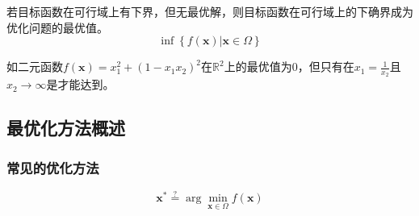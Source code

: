\begin{example}
    若目标函数在可行域上有下界，但无最优解，则目标函数在可行域上的下确界成为优化问题的最优值。
    \[
        \operatorname{inf}\left\{ f(\boldsymbol{x})| \boldsymbol{x}\in \Omega \right\}
    \]

    如二元函数$f(\boldsymbol{x}) = x_1^2+(1-x_1x_2)^2$在$\mathbb{R}^2$上的最优值为0，但只有在$x_1 = \frac{1}{x_2}$且$x_2\to \infty$是才能达到。
\end{example}

\subsection{最优化方法概述}
\subsubsection{常见的优化方法}
\[
    \boldsymbol{x}^* \overset{?}{=}  \arg\min\limits_{\boldsymbol{x}\in \Omega} f(\boldsymbol{x})
\]
